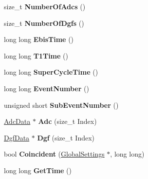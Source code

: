 \begin{DoxyCompactItemize}
\item 
\hypertarget{class_built_event_a1e50f0e800d504e04dbf62ddd9ba9b0d}{size\-\_\-t {\bfseries Number\-Of\-Adcs} ()}\label{class_built_event_a1e50f0e800d504e04dbf62ddd9ba9b0d}

\item 
\hypertarget{class_built_event_a5c01e6c2ada2435c6d7309dc7cb2fa5c}{size\-\_\-t {\bfseries Number\-Of\-Dgfs} ()}\label{class_built_event_a5c01e6c2ada2435c6d7309dc7cb2fa5c}

\item 
\hypertarget{class_built_event_aac0e9789b3e193a60c28a8c7643c37c1}{long long {\bfseries Ebis\-Time} ()}\label{class_built_event_aac0e9789b3e193a60c28a8c7643c37c1}

\item 
\hypertarget{class_built_event_adbe7cecefb72c1429bb46fb38839b6ed}{long long {\bfseries T1\-Time} ()}\label{class_built_event_adbe7cecefb72c1429bb46fb38839b6ed}

\item 
\hypertarget{class_built_event_a3bcfcdef39836deeae613b1feadce8ca}{long long {\bfseries Super\-Cycle\-Time} ()}\label{class_built_event_a3bcfcdef39836deeae613b1feadce8ca}

\item 
\hypertarget{class_built_event_a699e90b7621ae7e8e139c0f9f7ac36df}{long long {\bfseries Event\-Number} ()}\label{class_built_event_a699e90b7621ae7e8e139c0f9f7ac36df}

\item 
\hypertarget{class_built_event_a634ff74c48a2414782e5b55a606d9c02}{unsigned short {\bfseries Sub\-Event\-Number} ()}\label{class_built_event_a634ff74c48a2414782e5b55a606d9c02}

\item 
\hypertarget{class_built_event_aa031a6f9f75054f4bcd34a5ae0434211}{\hyperlink{class_adc_data}{Adc\-Data} $\ast$ {\bfseries Adc} (size\-\_\-t Index)}\label{class_built_event_aa031a6f9f75054f4bcd34a5ae0434211}

\item 
\hypertarget{class_built_event_ad0baf9c54126df4ef5be7110283d1a4d}{\hyperlink{class_dgf_data}{Dgf\-Data} $\ast$ {\bfseries Dgf} (size\-\_\-t Index)}\label{class_built_event_ad0baf9c54126df4ef5be7110283d1a4d}

\item 
\hypertarget{class_built_event_a264f67ad32d955fa2ff389c923bc69b0}{bool {\bfseries Coincident} (\hyperlink{class_global_settings}{Global\-Settings} $\ast$, long long)}\label{class_built_event_a264f67ad32d955fa2ff389c923bc69b0}

\item 
\hypertarget{class_built_event_af5244b5b93aa8e0adfcaf3fa70be5617}{long long {\bfseries Get\-Time} ()}\label{class_built_event_af5244b5b93aa8e0adfcaf3fa70be5617}

\end{DoxyCompactItemize}
